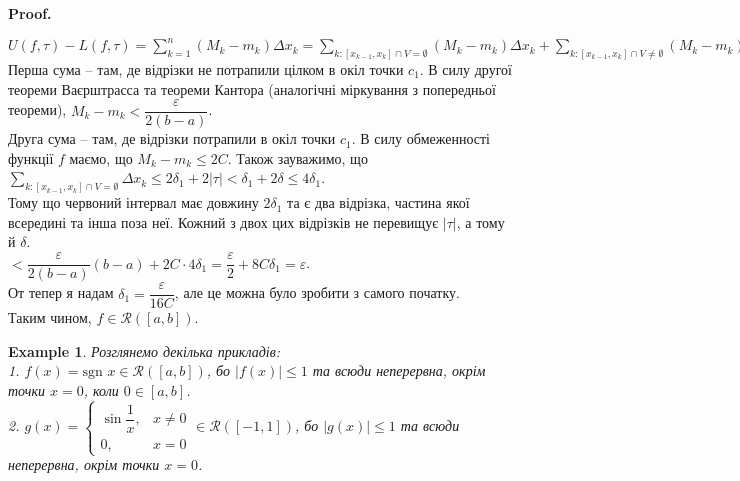 \documentclass[a4paper, 10pt]{article}
\makeatletter
\def\huge{\displaystyle}
\def\qed{$\blacksquare$}
\theoremstyle{theoremdd}
\theoremstyle{theoremdd}
\theoremstyle{theoremdd}
\theoremstyle{theoremdd}
\theoremstyle{theoremdd}
\newtheorem{example}[theorem]{Example}
\theoremstyle{theoremdd}
\theoremstyle{theoremdd}
\theoremstyle{theoremdd}
\theoremstyle{theoremdd}
\renewenvironment{proof}[1][Proof.\\]{\par
\pushQED{\hfill \qed}%
\normalfont \topsep6\p@\@plus6\p@\relax
\trivlist
\item\relax
{\bfseries
#1\@addpunct{.}}\hspace\labelsep\ignorespaces
}{%
\popQED\endtrivlist\@endpefalse
}
\makeatother
\begin{document}
\begin{proof}
\begin{figure}[H]
\end{figure}
$U(f,\tau) - L(f,\tau) = \huge\sum_{k=1}^n (M_k-m_k) \Delta x_k = \huge\sum_{k:[x_{k-1},x_k] \cap V = \emptyset} (M_k - m_k) \Delta x_k + \sum_{k: [x_{k-1},x_{k}] \cap V \neq \emptyset} (M_k - m_k) \Delta x_k \boxed{<}$\\
Перша сума -- там, де відрізки не потрапили цілком в окіл точки $c_1$. В силу другої теореми Ваєрштрасса та теореми Кантора (аналогічні міркування з попередньої теореми), $M_k - m_k < \dfrac{\varepsilon}{2(b-a)}$.\\
Друга сума -- там, де відрізки потрапили в окіл точки $c_1$. В силу обмеженності функції $f$ маємо, що $M_k-m_k \leq 2C$. Також зауважимо, що $\huge\sum_{k:[x_{k-1},x_k] \cap V = \emptyset} \Delta x_k \leq 2 \delta_1 + 2 |\tau| <  \delta_1 + 2 \delta \leq 4\delta_1$.\\
Тому що червоний інтервал має довжину $2\delta_1$ та є два відрізка, частина якої всередині та інша поза неї. Кожний з двох цих відрізків не перевищує $|\tau|$, а тому й $\delta$.\\
$\boxed{<} \dfrac{\varepsilon}{2(b-a)} (b-a) + 2 C \cdot 4 \delta_1 = \dfrac{\varepsilon}{2} + 8C\delta_1 = \varepsilon$.\\
От тепер я надам $\delta_1 = \dfrac{\varepsilon}{16C}$, але це можна було зробити з самого початку.\\
Таким чином, $f \in \mathcal{R}([a,b])$.
\iffalse
\bigskip \\
Ось далі крок МІ: ми припускаємо, що коли $f \in C([a,b]) \setminus \{c_1,c_2,\dots,c_n\})$, то тоді $f \in \mathcal{R}([a,b])$. Доведемо, що коли уже $f \in C([a,b]) \setminus \{c_1,c_2,\dots,c_n,c_{n+1}\})$, то тоді $f \in \mathcal{R}([a,b])$.\\
Не втрачаючи загальності, розглянемо деяку точку $x^* \in (c_n,c_{n+1})$, а далі будемо дивитись на функцію $f$ на $[a,x^*]$ та $[x^*,b]$.\\
На першому відрізку рівно $n$ точок розриву. За припущенням МІ, $f \in \mathcal{R}([a,x^*])$.\\
На другому відрізку рівно $1$ точка розриву. Уже доводили для неї, що $f \in \mathcal{R}([x^*,b])$.\\
А тоді за адитивністю, маємо $f \in \mathcal{R}([a,b])$. МІ доведено.
\fi
\end{proof}

\begin{example}
Розглянемо декілька прикладів:\\
1. $f(x) = \text{sgn }x \in \mathcal{R}([a,b])$, бо $|f(x)| \leq 1$ та всюди неперервна, окрім точки $x = 0$, коли $0 \in [a,b]$.\\
2. $g(x) = \begin{cases} \sin \dfrac{1}{x}, & x \neq 0 \\ 0, & x = 0 \end{cases} \in \mathcal{R}([-1,1])$, бо $|g(x)| \leq 1$ та всюди неперервна, окрім точки $x = 0$.
\end{example}
\end{document}
